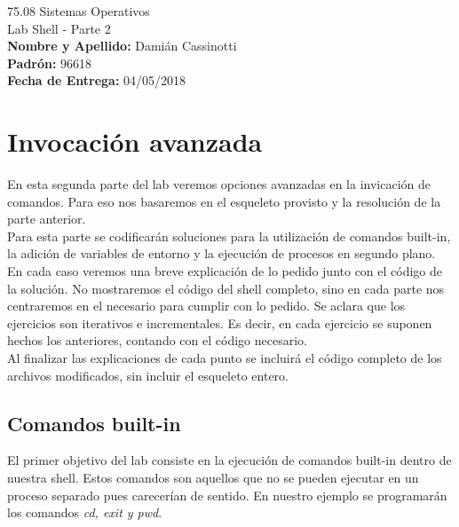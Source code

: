 \documentclass[a4paper, 12pt]{article}
\begin{document}
		
	\begin{titlepage}
		\vspace*{\fill}
		\begin{center}
			\Large 75.08 Sistemas Operativos \\
			\Huge Lab Shell - Parte 2 \\
			\bigskip\bigskip\bigskip
			\large\textbf{Nombre y Apellido:} Damián Cassinotti \\
			\textbf{Padrón:} 96618 \\
			\textbf{Fecha de Entrega:} 04/05/2018\\
					
		\end{center}
		\vspace*{\fill}
	\end{titlepage}
	\newpage
			
	\tableofcontents
	\newpage
	
	\section{Invocación avanzada}
		En esta segunda parte del lab veremos opciones avanzadas en la invicación de comandos. Para eso nos basaremos en el esqueleto provisto y la resolución de la parte anterior.\\
		
		Para esta parte se codificarán soluciones para la utilización de comandos built-in, la adición de variables de entorno y la ejecución de procesos en segundo plano.\\
		
		En cada caso veremos una breve explicación de lo pedido junto con el código de la solución. No mostraremos el código del shell completo, sino en cada parte nos centraremos en el necesario para cumplir con lo pedido. Se aclara que los ejercicios son iterativos e incrementales. Es decir, en cada ejercicio se suponen hechos los anteriores, contando con el código necesario.\\
		
		Al finalizar las explicaciones de cada punto se incluirá el código completo de los archivos modificados, sin incluir el esqueleto entero.
		\subsection{Comandos built-in}
		El primer objetivo del lab consiste en la ejecución de comandos built-in dentro de nuestra shell. Estos comandos son aquellos que no se pueden ejecutar en un proceso separado pues carecerían de sentido. En nuestro ejemplo se programarán los comandos \textit{cd, exit y pwd}.\\
		
\end{document}
